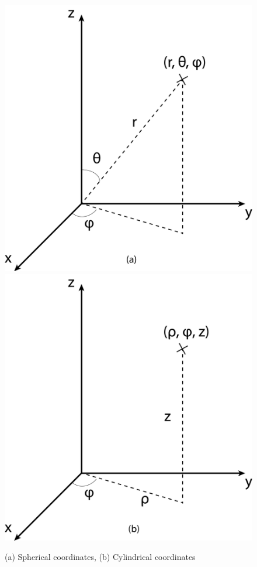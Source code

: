 \documentclass{article}
\theoremstyle{definition}
\begin{document}
\begin{figure}[h!]
	\centering
	\includegraphics[scale=0.15]{gr-fig-3a.png}
	\includegraphics[scale=0.15]{gr-fig-3b.png}
	\caption{(a) Spherical coordinates, (b) Cylindrical coordinates}
\end{figure}
\end{document}
